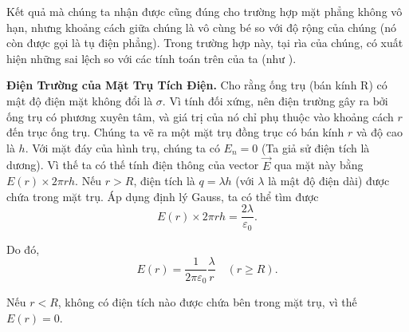 Kết quả mà chúng ta nhận được cũng đúng cho trường hợp mặt phẳng không vô hạn, nhưng khoảng cách giữa chúng là vô cùng bé so với độ rộng của chúng (nó còn được gọi là tụ điện phẳng). Trong trường hợp này, tại rìa của chúng, có xuất hiện những sai lệch so với các tính toán trên của ta (như ).

\textbf{Điện Trường của Mặt Trụ Tích Điện.} Cho rằng ống trụ (bán kính R) có mật độ điện mặt không đổi là $\sigma$. Vì tính đối xứng, nên điện trường gây ra bởi ống trụ có phương xuyên tâm, và giá trị của nó chỉ phụ thuộc vào khoảng cách $r$ đến trục ống trụ. Chúng ta vẽ ra một mặt trụ đồng trục có bán kính $r$ và độ cao là $h$. Với mặt đáy của hình trụ, chúng ta có $E_n=0$ (Ta giả sử điện tích là dương). Vì thế ta có thế tính điện thông của vector $\vec{E}$ qua mặt này bằng $E(r)\times 2\pi rh$. Nếu $r>R$, điện tích là $q=\lambda h$ (với $\lambda$ là mật độ điện dài) được chứa trong mặt trụ. Áp dụng định lý Gauss, ta có thể tìm được 
\begin{equation*}
	E(r)\times 2\pi rh = \frac{2\lambda}{\varepsilon_0}.
\end{equation*}

\noindent
Do đó,
\begin{equation}\label{eq:1_122}
	E(r) = \frac{1}{2\pi\varepsilon_0}\frac{\lambda}{r}\quad (r\geqslant R).
\end{equation}

\noindent
Nếu $r<R$, không có điện tích nào được chứa bên trong mặt trụ, vì thế $E(r)=0$.

